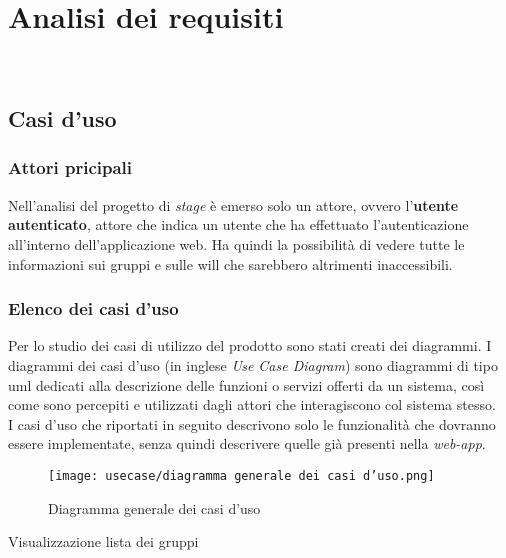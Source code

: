 
\chapter{Analisi dei requisiti}
\label{cap:analisi-requisiti}

\\

\section{Casi d'uso}
\subsection*{Attori pricipali}
Nell'analisi del progetto di \textit{stage} è emerso solo un attore, ovvero l'\textbf{utente autenticato}, 
attore che indica un utente che ha effettuato l'autenticazione
all'interno dell'applicazione web. Ha quindi la possibilità di vedere tutte le
informazioni sui gruppi e sulle \gls{will}  che sarebbero altrimenti inaccessibili. 

\subsection*{Elenco dei casi d'uso}
Per lo studio dei casi di utilizzo del prodotto sono stati creati dei diagrammi.
I diagrammi dei casi d'uso (in inglese \emph{Use Case Diagram}) sono diagrammi di tipo \gls{uml} dedicati alla descrizione delle funzioni o servizi offerti da un sistema, così come sono percepiti e utilizzati dagli attori che interagiscono col sistema stesso.\\
I casi d'uso che riportati in seguito descrivono solo le funzionalità che dovranno essere implementate, senza quindi descrivere quelle già presenti nella \textit{web-app}. 
\begin{figure}[H] 
    \centering 
    \texttt{[image: usecase/diagramma generale dei casi d'uso.png]} 
    \caption{Diagramma generale dei casi d'uso}
\end{figure}

\begin{usecase}{Visualizzazione lista dei gruppi}
    \label{uc:scenario-visualizzazione-lista-gruppi}
\end{usecase}
\newpage


